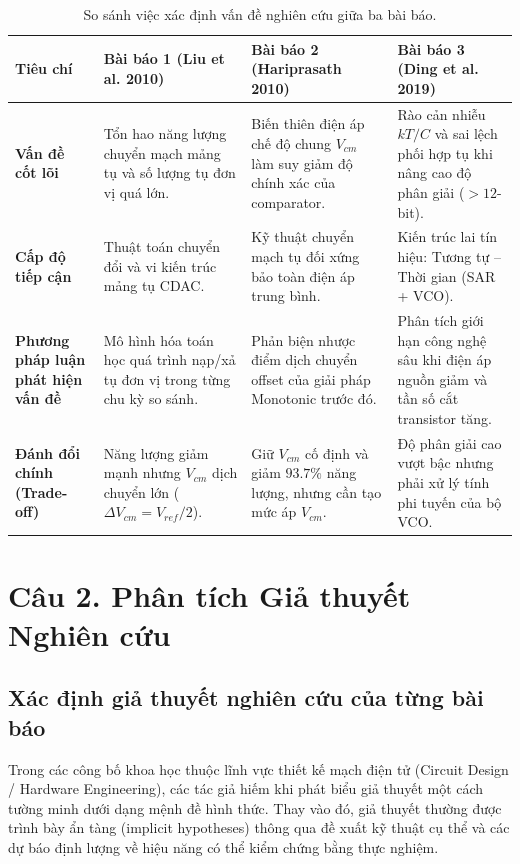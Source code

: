 \documentclass[12pt,a4paper]{article}
\begin{document}
\begin{table}[H]
\centering
\small
\setlength{\tabcolsep}{5pt}
\caption{So sánh việc xác định vấn đề nghiên cứu giữa ba bài báo.}
\label{tab:ss_cau1}
\begin{tabularx}{\textwidth}{>{\RaggedRight}p{2.6cm} >{\RaggedRight}X >{\RaggedRight}p{3.8cm} >{\RaggedRight}p{3.5cm}}
\toprule
\textbf{Tiêu chí} & \textbf{Bài báo 1 (Liu et al. 2010)} & \textbf{Bài báo 2 (Hariprasath 2010)} & \textbf{Bài báo 3 (Ding et al. 2019)} \\
\midrule
\textbf{Vấn đề cốt lõi} & Tổn hao năng lượng chuyển mạch mảng tụ và số lượng tụ đơn vị quá lớn. & Biến thiên điện áp chế độ chung $V_{cm}$ làm suy giảm độ chính xác của comparator. & Rào cản nhiễu $kT/C$ và sai lệch phối hợp tụ khi nâng cao độ phân giải ($>12$-bit). \\
\addlinespace
\textbf{Cấp độ tiếp cận} & Thuật toán chuyển đổi và vi kiến trúc mảng tụ CDAC. & Kỹ thuật chuyển mạch tụ đối xứng bảo toàn điện áp trung bình. & Kiến trúc lai tín hiệu: Tương tự -- Thời gian (SAR + VCO). \\
\addlinespace
\textbf{Phương pháp luận phát hiện vấn đề} & Mô hình hóa toán học quá trình nạp/xả tụ đơn vị trong từng chu kỳ so sánh. & Phản biện nhược điểm dịch chuyển offset của giải pháp Monotonic trước đó. & Phân tích giới hạn công nghệ sâu khi điện áp nguồn giảm và tần số cắt transistor tăng. \\
\addlinespace
\textbf{Đánh đổi chính (Trade-off)} & Năng lượng giảm mạnh nhưng $V_{cm}$ dịch chuyển lớn ($\Delta V_{cm} = V_{ref}/2$). & Giữ $V_{cm}$ cố định và giảm $93.7\%$ năng lượng, nhưng cần tạo mức áp $V_{cm}$. & Độ phân giải cao vượt bậc nhưng phải xử lý tính phi tuyến của bộ VCO. \\
\bottomrule
\end{tabularx}
\end{table}

\section{Câu 2. Phân tích Giả thuyết Nghiên cứu}

\subsection{Xác định giả thuyết nghiên cứu của từng bài báo}
Trong các công bố khoa học thuộc lĩnh vực thiết kế mạch điện tử (Circuit Design / Hardware Engineering), các tác giả hiếm khi phát biểu giả thuyết một cách tường minh dưới dạng mệnh đề hình thức. Thay vào đó, giả thuyết thường được trình bày ẩn tàng (implicit hypotheses) thông qua đề xuất kỹ thuật cụ thể và các dự báo định lượng về hiệu năng có thể kiểm chứng bằng thực nghiệm.
\end{document}
